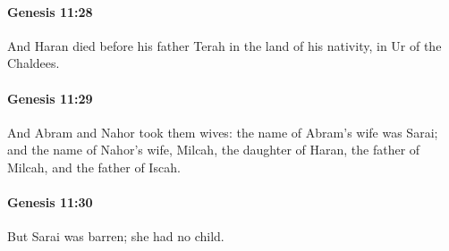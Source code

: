 		\paragraph{Genesis 11:28} %
			\label{GENESIS-11-28}

			And Haran died before his father Terah in the land of his nativity, in Ur of the Chaldees.


		\paragraph{Genesis 11:29} %
			\label{GENESIS-11-29}

			And Abram and Nahor took them wives: the name of Abram's wife was Sarai; and the name of Nahor's wife, Milcah, the daughter of Haran, the father of Milcah, and the father of Iscah.


		\paragraph{Genesis 11:30} %
			\label{GENESIS-11-30}

			But Sarai was barren; she had no child.


